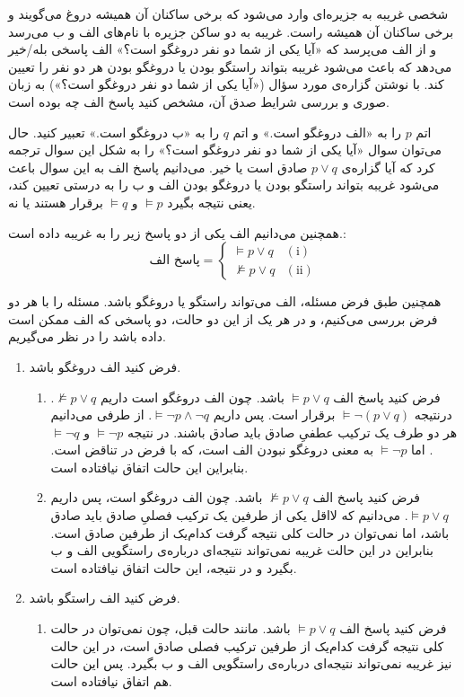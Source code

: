 شخصی غریبه به جزیره‌ای وارد می‌شود که برخی ساکنان آن همیشه دروغ می‌گویند و برخی ساکنان آن همیشه راست. غریبه به دو ساکن جزیره با نام‌های الف و ب می‌رسد و از الف می‌پرسد که «آیا یکی از شما دو نفر دروغگو است؟» الف پاسخی بله/خیر می‌دهد که باعث می‌شود غریبه بتواند راستگو بودن یا دروغگو بودن هر دو نفر را تعیین کند. با نوشتن گزاره‌ی مورد سؤال («آیا یکی از شما دو نفر دروغگو است؟») به زبان صوری و بررسی شرایط صدق آن، مشخص کنید پاسخ الف چه بوده است.
\begin{ans}
  اتم‌
  $p$
  را به «الف دروغگو است.» و اتم
  $q$
  را به «ب دروغگو است.» تعبیر کنید. حال می‌توان سوال «آیا یکی از شما دو نفر دروغگو است؟» را به شکل این سوال ترجمه کرد که آیا گزاره‌ی $p \vee q$ صادق است یا خیر. می‌دانیم پاسخ الف به این سوال باعث می‌شود غریبه بتواند راستگو بودن یا دروغگو بودن الف و ب را به درستی تعیین کند، یعنی نتیجه بگیرد
  $\models p$
  و
  $\models q$
  برقرار هستند یا نه.
  
  همچنین می‌دانیم الف یکی از دو پاسخ زیر را به غریبه داده است.:
  \[ \text{پاسخ الف} =
    \begin{cases}
      \models p \vee q & (\text{i}) \\
      \not \models p \vee q & (\text{ii})
    \end{cases}
  \]

همچنین طبق فرض مسئله، الف می‌تواند راستگو یا دروغگو باشد. مسئله را با هر دو فرض بررسی می‌کنیم، و در هر یک از این دو حالت، دو پاسخی که الف ممکن است داده باشد را در نظر می‌گیریم.
  \begin{enumerate}
    \item فرض کنید الف دروغگو باشد.
    \begin{enumerate}
      \item فرض کنید پاسخ الف $\models p \vee q$
      باشد. چون الف دروغگو است داریم
      $\not \models p \vee q$.
      درنتیجه
      $\models \neg (p \vee q)$
      برقرار است. پس داریم
      $\models \neg p \wedge \neg q$.
      از طرفی می‌دانیم هر دو طرف یک ترکیب عطفیِ صادق باید صادق باشند. در نتیجه
      $\models \neg p$
      و
      $\models \neg q$.
      اما
      $\models \neg p$
      به معنی دروغگو نبودن الف است، که با فرض در تناقض است. بنابراین این حالت اتفاق نیافتاده است.
      
      \item فرض کنید پاسخ الف $\not \models p \vee q$
      باشد. چون الف دروغگو است، پس داریم
      $\models p \vee q$.
      می‌دانیم که لااقل یکی از طرفین یک ترکیب فصلیِ صادق باید صادق باشد، اما نمی‌توان در حالت کلی نتیجه گرفت کدام‌یک از طرفین صادق است. بنابراین در این حالت غریبه نمی‌تواند نتیجه‌ای درباره‌ی راستگویی الف و ب بگیرد و در نتیجه، این حالت اتفاق نیافتاده است.
    \end{enumerate}
    \item فرض کنید الف راستگو باشد.
    \begin{enumerate}
      \item فرض کنید پاسخ الف $\models p \vee q$
      باشد. مانند حالت قبل، چون نمی‌توان در حالت کلی نتیجه گرفت کدام‌یک از طرفین ترکیب فصلی صادق است، در این حالت نیز غریبه نمی‌تواند نتیجه‌ای درباره‌ی راستگویی الف و ب بگیرد. پس این حالت هم اتفاق نیافتاده است.


\end{enumerate}
\end{enumerate}
\end{ans}
